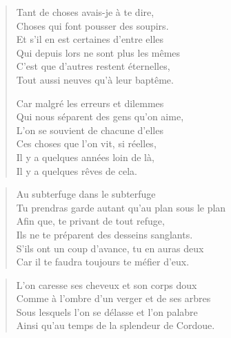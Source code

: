 \begin{verse}\sizain
  Tant de choses avais-je à te dire,\\ 
  Choses qui font pousser des soupirs.\\ 
  Et s’il en est certaines d’entre elles\\ 
  Qui depuis lors ne sont plus les mêmes\\ 
  C’est que d’autres restent éternelles,\\ 
  Tout aussi neuves qu’à leur baptême.  %

  Car malgré les erreurs et dilemmes\\ 
  Qui nous séparent des gens qu’on aime,\\ 
  L’on se souvient de chacune d’elles\\ 
  Ces choses que l’on vit, si réelles,\\ 
  Il y a quelques années loin de là,\\ 
  Il y a quelques rêves de cela.  %
\end{verse}


\begin{verse}\sizain
  Au subterfuge dans le subterfuge\\ 
  Tu prendras garde autant qu’au plan sous le plan\\ 
  Afin que, te privant de tout refuge,\\ 
  Ils ne te préparent des desseins sanglants.\\ 
  S’ils ont un coup d’avance, tu en auras deux\\ 
  Car il te faudra toujours te méfier d’eux.  %
\end{verse}

\begin{verse}\quatrain
  L’on caresse ses cheveux et son corps doux\\ 
  Comme à l’ombre d’un verger et de ses arbres\\ 
  Sous lesquels l’on se délasse et l’on palabre\\ 
  Ainsi qu’au temps de la splendeur de Cordoue.  %
\end{verse}

